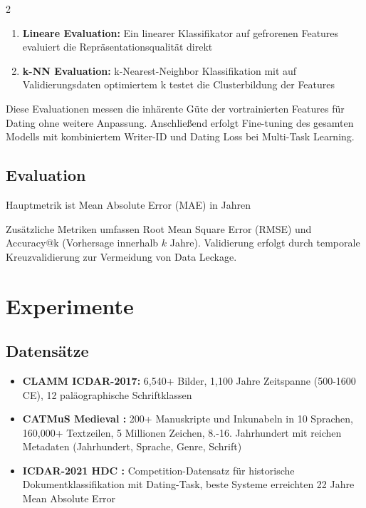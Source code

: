 \documentclass[12pt,a4paper]{article}
\begin{document}
\begin{multicols}{2}
\begin{enumerate}
\item \textbf{Lineare Evaluation:} Ein linearer Klassifikator auf gefrorenen Features evaluiert die Repräsentationsqualität direkt
\item \textbf{k-NN Evaluation:} k-Nearest-Neighbor Klassifikation mit auf Validierungsdaten optimiertem k testet die Clusterbildung der Features
\end{enumerate}

Diese Evaluationen messen die inhärente Güte der vortrainierten Features für Dating ohne weitere Anpassung. Anschließend erfolgt Fine-tuning des gesamten Modells mit kombiniertem Writer-ID und Dating Loss bei Multi-Task Learning.

\subsection{Evaluation}

Hauptmetrik ist Mean Absolute Error (MAE) in Jahren

Zusätzliche Metriken umfassen Root Mean Square Error (RMSE) und Accuracy@k (Vorhersage innerhalb $k$ Jahre). Validierung erfolgt durch temporale Kreuzvalidierung zur Vermeidung von Data Leckage.

\section{Experimente}

\subsection{Datensätze}

\begin{itemize}
\item \textbf{CLAMM ICDAR-2017:} 6,540+ Bilder, 1,100 Jahre Zeitspanne (500-1600 CE), 12 paläographische Schriftklassen
\item \textbf{CATMuS Medieval \cite{clerice2024}:} 200+ Manuskripte und Inkunabeln in 10 Sprachen, 160,000+ Textzeilen, 5 Millionen Zeichen, 8.-16. Jahrhundert mit reichen Metadaten (Jahrhundert, Sprache, Genre, Schrift)
\item \textbf{ICDAR-2021 HDC \cite{seuret2021}:} Competition-Datensatz für historische Dokumentklassifikation mit Dating-Task, beste Systeme erreichten 22 Jahre Mean Absolute Error
\end{itemize}


\end{multicols}
\end{document}
